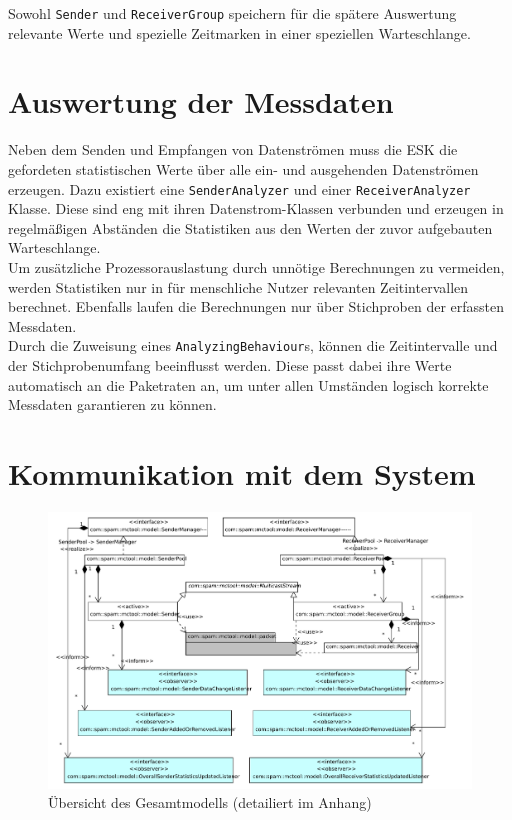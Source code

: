Sowohl \texttt{Sender} und \texttt{ReceiverGroup} speichern für die spätere
Auswertung relevante Werte und spezielle Zeitmarken in einer speziellen
Warteschlange.

\section{Auswertung der Messdaten}
Neben dem Senden und Empfangen von Datenströmen muss die ESK die gefordeten
statistischen Werte über alle ein- und ausgehenden Datenströmen erzeugen. Dazu
existiert eine \texttt{SenderAnalyzer} und einer \texttt{ReceiverAnalyzer}
Klasse. Diese sind eng mit ihren Datenstrom-Klassen verbunden und erzeugen in
regelmäßigen Abständen die Statistiken aus den Werten der zuvor aufgebauten
Warteschlange.\\
Um zusätzliche Prozessorauslastung durch unnötige Berechnungen zu vermeiden,
werden Statistiken nur in für menschliche Nutzer relevanten Zeitintervallen
berechnet. Ebenfalls laufen die Berechnungen nur über Stichproben der erfassten
Messdaten.\\
Durch die Zuweisung eines \texttt{AnalyzingBehaviour}s, können die
Zeitintervalle und der Stichprobenumfang beeinflusst werden. Diese passt dabei
ihre Werte automatisch an die Paketraten an, um unter allen Umständen logisch
korrekte Messdaten garantieren zu können.

\section{Kommunikation mit dem System}

\begin{figure}[H]
\center
\includegraphics[width=17cm]{images/model_ov.pdf}
\caption{Übersicht des Gesamtmodells (detailiert im Anhang)}
\end{figure}

